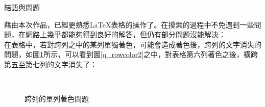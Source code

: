 \newpage
\centerline{{\BCF 結語與問題}}
\setlength{\parindent}{2em}   
	藉由本次作品，已經更熟悉\LaTeX 表格的操作了。在摸索的過程中不免遇到一些問題，在網路上幾乎都能夠得到良好的解答，但仍有部分問題沒能解決：\\
	在表格中，若對跨列之中的某列單獨著色，可能會造成著色後，跨列的文字消失的問題，如圖\ref{q_rowcolor}所示，可以看到圖\ref{q_rowcolor2}之中，對表格第六列著色之後，橫跨第五至第七列的文字消失了：
	\begin{figure}[H]
		\centering
		\\
		\caption{跨列的單列著色問題} \label{q_rowcolor}
	\end{figure}

\newpage
\nocite{*}




